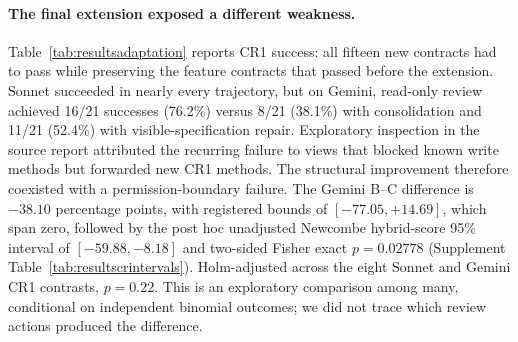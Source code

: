 \paragraph{The final extension exposed a different weakness.}
Table~\ref{tab:resultsadaptation} reports CR1 success: all fifteen new
contracts had to pass while preserving the feature contracts that passed
before the extension. Sonnet succeeded in nearly every trajectory, but on
Gemini, read-only review achieved 16/21 successes (76.2\%) versus 8/21
(38.1\%) with consolidation and 11/21 (52.4\%) with visible-specification
repair. Exploratory inspection in the source report attributed the recurring failure
to views that blocked known write methods but forwarded new CR1 methods.
The structural improvement therefore coexisted with a permission-boundary
failure. The Gemini B--C difference is $-38.10$ percentage points, with
registered bounds of $[-77.05,+14.69]$, which span zero, followed by the
post hoc unadjusted Newcombe hybrid-score 95\% interval of $[-59.88,-8.18]$
and two-sided Fisher exact $p=0.02778$
(Supplement Table~\ref{tab:resultscrintervals}).
Holm-adjusted across the eight Sonnet and Gemini CR1 contrasts, $p=0.22$.
This is an exploratory
comparison among many, conditional on independent binomial outcomes;
we did not trace which review actions produced the difference.

